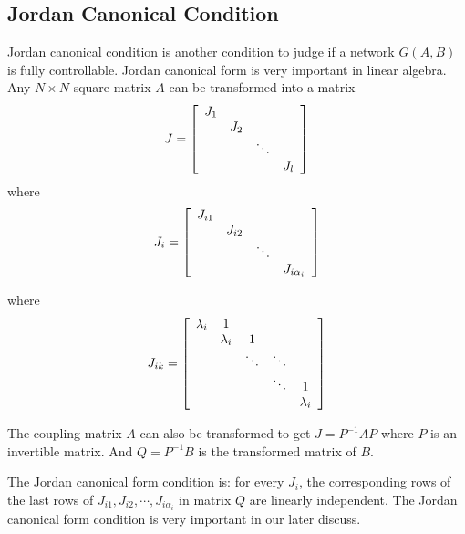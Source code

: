 \documentclass[10pt, conference, letterpaper]{IEEEtran}
\begin{document}
\subsection{Jordan Canonical Condition}
Jordan canonical condition is another condition to judge if a network $G(A,B)$ is fully controllable. Jordan canonical form is very important in linear algebra. Any $N \times N$ square matrix $A$ can be transformed into a matrix
\begin{equation*}
J = {\left[ \begin{array}
{c c c c}
J_1&  &  & \\
 & J_2 &  & \\
 &  & \ddots &\\
& &  &  J_l\\

\end{array}
\right ]}
\end{equation*}
where
\begin{equation*}
J_i = {\left[ \begin{array}
{c c c c}
J_{i1}&  &  & \\
 & J_{i2} &  & \\
 &  & \ddots &\\
& &  &  J_{i\alpha_i}\\

\end{array}
\right ]}
\end{equation*}

where
\begin{equation*}
J_{ik} = {\left[ \begin{array}
{c c c c c}
\lambda_i& 1 &  &  &\\
 &\lambda_i & 1 & &\\
 &  & \ddots &\ddots &\\
& &  & \ddots &1 \\
& & & & \lambda_i\\

\end{array}
\right ]}
\end{equation*}

The coupling matrix $A$ can also be transformed to get $J=P^{-1}AP$ where $P$ is an invertible matrix. And $Q=P^{-1}B$ is the transformed matrix of $B$.

The Jordan canonical form condition is: for every $J_i$, the corresponding rows of the last rows of $J_{i1},J_{i2},\cdots, J_{i\alpha_i}$ in matrix $Q$ are linearly independent.
The Jordan canonical form condition is very important in our later discuss.
\end{document}
